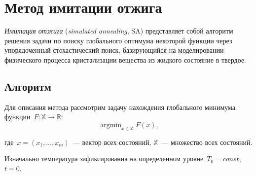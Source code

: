\chapter{Метод имитации отжига} \label{SimulatedAnnealing}
\noindent
\textit{Имитация отжига} (\emph{simulated annealing}, SA) представляет собой алгоритм решения задачи по поиску глобального оптимума некоторой функции через упорядоченный стохастический поиск, базирующийся на моделировании физического процесса кристализации вещества из жидкого состояние в твердое.

\section{Алгоритм}

\noindent Для описания метода рассмотрим задачу нахождения глобального минимума функции~$F \colon \mathbb{X} \to \mathbb{R}$:
\[
	\mathop{\mathrm{argmin}}_{x \in \mathbb{X}} F(x),
\]

\noindent где~$x = (x_{1},\ldots , x_{m})$~--- вектор всех состояний, $\mathbb{X}$~--- множество всех состояний.

Изначально температура зафиксированна на определенном уровне~$T_0 = const$, $t = 0$.

